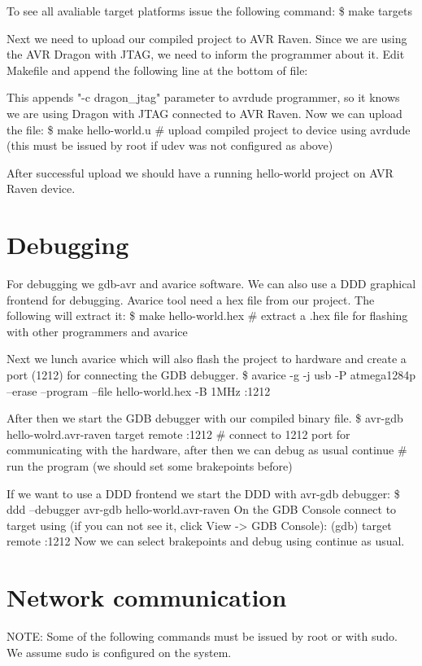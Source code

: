 \documentclass{article}
\begin{document}
To see all avaliable target platforms issue the following command:
\$ make targets


Next we need to upload our compiled project to AVR Raven.
Since we are using the AVR Dragon with JTAG, we need to inform the programmer about it.
Edit Makefile and append the following line at the bottom of file:


This appends "-c dragon\_jtag" parameter to avrdude programmer, so it knows we are using Dragon with JTAG connected to AVR Raven.
Now we can upload the file:
\$ make hello-world.u                \# upload compiled project to device using avrdude (this must be issued by root if udev was not configured as above)

After successful upload we should have a running hello-world project on AVR Raven device.


\section{Debugging}
For debugging we gdb-avr and avarice software. We can also use a DDD graphical frontend for debugging.
Avarice tool need a hex file from our project. The following will extract it:
\$ make hello-world.hex              \# extract a .hex file for flashing with other programmers and avarice

Next we lunch avarice which will also flash the project to hardware and create a port (1212) for connecting the GDB debugger.
\$ avarice -g -j usb -P atmega1284p --erase --program --file hello-world.hex -B 1MHz  :1212

After then we start the GDB debugger with our compiled binary file.
\$ avr-gdb hello-wolrd.avr-raven
target remote :1212                 \# connect to 1212 port for communicating with the hardware, after then we can debug as usual
continue                            \# run the program (we should set some brakepoints before)

If we want to use a DDD frontend we start the DDD with avr-gdb debugger:
\$ ddd --debugger avr-gdb  hello-world.avr-raven
On the GDB Console connect to target using (if you can not see it, click View -> GDB Console):
(gdb) target remote :1212
Now we can select brakepoints and debug using continue as usual.


\section{Network communication}
NOTE: Some of the following commands must be issued by root or with sudo. We assume sudo is configured on the system.
\end{document}
